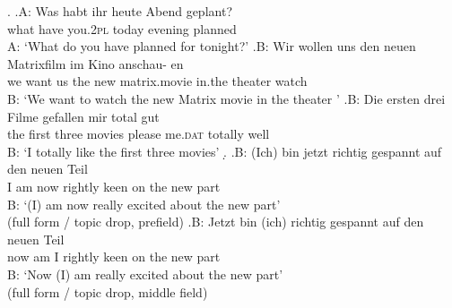 \ex.\label{ex:item.pf.mf}
\ag.A: Was habt ihr heute Abend geplant?\\
{} what have you.\textsc{2pl} today evening planned\\
A: `What do you have planned for tonight?'
\bg.B: Wir wollen uns den neuen Matrixfilm im Kino anschau- \newline en \\
{} we want us the new matrix.movie in.the theater watch\\
\vspace{-\baselineskip}
B: `We want to watch the new Matrix movie in the theater \phantom{mi}'
\cg.B: Die ersten drei Filme gefallen mir total gut\\
{} the first three movies please me.\textsc{dat} totally well\\
B: `I totally like the first three movies'
\d.
\ag.\label{ex:item.pf.mf.pf}B: (Ich) bin jetzt richtig gespannt auf den neuen Teil\\
{} I am now rightly keen on the new part\\
B: `(I) am now really excited about the new part' \\\phantom{.}\hfill (full form / topic drop, prefield)
\bg.\label{ex:item.pf.mf.mf}B: Jetzt bin (ich) richtig gespannt auf den neuen Teil\\
{} now am I rightly keen on the new part\\
B: `Now (I) am really excited about the new part' \\\phantom{.}\hfill (full form / topic drop, middle field)


